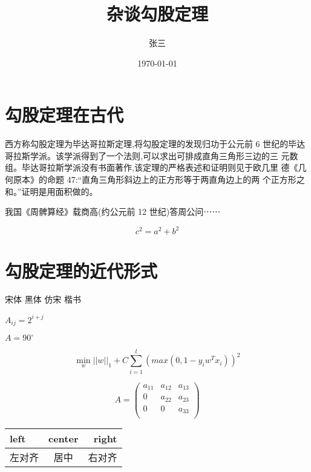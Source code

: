 \documentclass[UTF8]{ctexart}
\title{\heiti 杂谈勾股定理}
\author{\kaishu 张三}
\date{\today}
\begin{document}
\maketitle 

\tableofcontents 

\newpage
\section{勾股定理在古代}

西方称勾股定理为毕达哥拉斯定理,将勾股定理的发现归功于公元前 6 世纪的毕达哥拉斯学派。该学派得到了一个法则,可以求出可排成直角三角形三边的三 元数组。毕达哥拉斯学派没有书面著作,该定理的严格表述和证明则见于欧几里 德《几何原本》的命题 47:“直角三角形斜边上的正方形等于两直角边上的两
个正方形之和。”证明是用面积做的。 

我国《周髀算经》载商高(约公元前 12 世纪)答周公问⋯⋯

$$c^2 = a^2 + b^2$$
\newpage
\section{勾股定理的近代形式} 
{\songti 宋体} {\heiti 黑体} {\fangsong 仿宋} {\kaishu 楷书} 

\newpage


\newpage
{}

$A_{ij}=2^{i+j}$

$A=90^\circ$

\[
\min_w   {||w||_{1} + C\sum_{i=1}^l (max(0, 1 - y_{i}w^{T}x_{i}))^{2}}
\]

\[
A = \begin{pmatrix}
a_{11} & a_{12} & a_{13} \\
0 & a_{22} & a_{23} \\
0 & 0 & a_{33} \\
\end{pmatrix}
\]

\begin{tabular}{|l|c|r|}
\hline
left & center & right \\
\hline
左对齐 &居中 & 右对齐 \\
\hline
\end{tabular}
\end{document}
